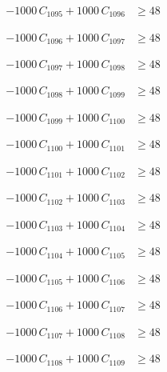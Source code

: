 \documentclass[a4paper,11pt]{article}
\begin{document}
\begin{align}
-1000\,C_{1095} + 1000\,C_{1096} &\geq 48 \nonumber
\end{align}

\begin{align}
-1000\,C_{1096} + 1000\,C_{1097} &\geq 48 \nonumber
\end{align}

\begin{align}
-1000\,C_{1097} + 1000\,C_{1098} &\geq 48 \nonumber
\end{align}

\begin{align}
-1000\,C_{1098} + 1000\,C_{1099} &\geq 48 \nonumber
\end{align}

\begin{align}
-1000\,C_{1099} + 1000\,C_{1100} &\geq 48 \nonumber
\end{align}

\begin{align}
-1000\,C_{1100} + 1000\,C_{1101} &\geq 48 \nonumber
\end{align}

\begin{align}
-1000\,C_{1101} + 1000\,C_{1102} &\geq 48 \nonumber
\end{align}

\begin{align}
-1000\,C_{1102} + 1000\,C_{1103} &\geq 48 \nonumber
\end{align}

\begin{align}
-1000\,C_{1103} + 1000\,C_{1104} &\geq 48 \nonumber
\end{align}

\begin{align}
-1000\,C_{1104} + 1000\,C_{1105} &\geq 48 \nonumber
\end{align}

\begin{align}
-1000\,C_{1105} + 1000\,C_{1106} &\geq 48 \nonumber
\end{align}

\begin{align}
-1000\,C_{1106} + 1000\,C_{1107} &\geq 48 \nonumber
\end{align}

\begin{align}
-1000\,C_{1107} + 1000\,C_{1108} &\geq 48 \nonumber
\end{align}

\begin{align}
-1000\,C_{1108} + 1000\,C_{1109} &\geq 48 \nonumber
\end{align}
\end{document}
